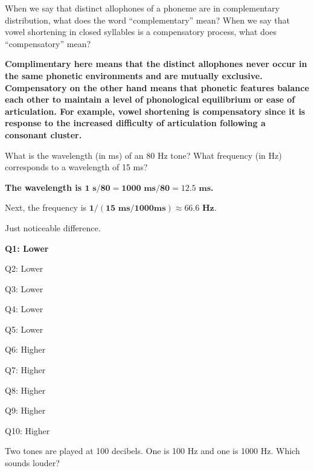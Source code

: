 \documentclass{../../templates/lkx_pset}
\begin{document}
\begin{problem}{5}
  When we say that distinct allophones of a phoneme are in complementary distribution, what does the word ``complementary'' mean? When we say that vowel shortening in closed syllables is a compensatory process, what does ``compensatory'' mean?
\end{problem}

\begin{solution}
  \bfseries
  Complimentary here means that the distinct allophones never occur in the same phonetic environments and are mutually exclusive. Compensatory on the other hand means that phonetic features balance each other to maintain a level of phonological equilibrium or ease of articulation. For example, vowel shortening is compensatory since it is response to the increased difficulty of articulation following a consonant cluster.
\end{solution}

\begin{problem}{6}
  What is the wavelength (in ms) of an 80 Hz tone? What frequency (in Hz) corresponds to a wavelength of 15 ms?
\end{problem}

\begin{solution}
  \bfseries
  The wavelength is $\mathbf{1\textrm{ s} / 80 = 1000 \textrm{ ms} / 80 = 12.5\textrm{ ms}}$. 

  Next, the frequency is $\mathbf{1/(15\textrm{ ms} / 1000 \textrm{ms}) \approx 66.6\textrm{ Hz}}$.
\end{solution}

\begin{problem}{7}
    Just noticeable difference.
\end{problem}

\begin{solution}
  \bfseries
  Q1: Lower

  Q2: Lower

  Q3: Lower

  Q4: Lower

  Q5: Lower

  Q6: Higher 

  Q7: Higher 

  Q8: Higher 

  Q9: Higher 

  Q10: Higher 
\end{solution}

\begin{problem}{8}
  Two tones are played at 100 decibels. One is 100 Hz and one is 1000 Hz. Which sounds louder?
\end{problem}
\end{document}
